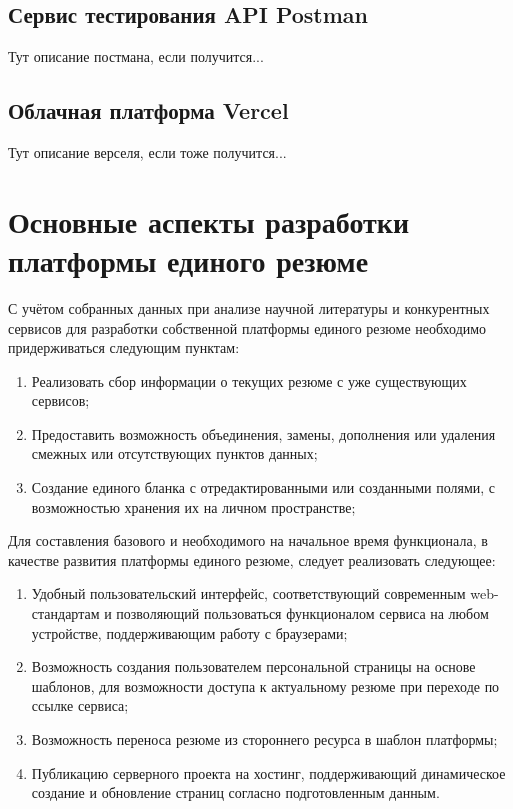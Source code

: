 \documentclass[master, och, diploma]{SCWorks}
\begin{document}
\subsection{Сервис тестирования API Postman}
Тут описание постмана, если получится...

\subsection{Облачная платформа Vercel}
Тут описание верселя, если тоже получится...


\section{Основные аспекты разработки платформы единого резюме}
С учётом собранных данных при анализе научной литературы и конкурентных сервисов для разработки собственной платформы единого резюме необходимо придерживаться следующим пунктам:
\begin{enumerate}
    \item Реализовать сбор информации о текущих резюме с уже существующих сервисов;
    \item Предоставить возможность объединения, замены, дополнения или удаления 
    смежных или отсутствующих пунктов данных;
    \item Создание единого бланка с отредактированными или созданными полями, 
    с возможностью хранения их на личном пространстве;
\end{enumerate}

Для составления базового и необходимого на начальное время функционала, в качестве развития платформы единого резюме, следует реализовать следующее:
\begin{enumerate}
    \item Удобный пользовательский интерфейс, соответствующий современным web-стандартам 
    и позволяющий пользоваться функционалом сервиса на любом устройстве, поддерживающим 
    работу с браузерами;
    \item Возможность создания пользователем персональной страницы на основе шаблонов, 
    для возможности доступа к актуальному резюме при переходе по ссылке сервиса;
    \item Возможность переноса резюме из стороннего ресурса в шаблон платформы;
    \item Публикацию серверного проекта на хостинг, поддерживающий динамическое 
    создание и обновление страниц согласно подготовленным данным.
\end{enumerate}
\end{document}
